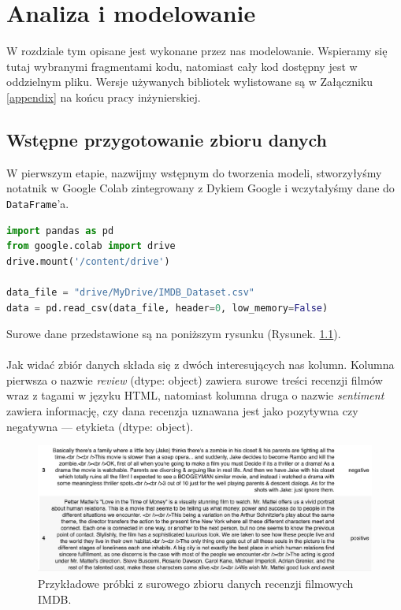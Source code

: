 \chapter{Analiza i modelowanie}
W rozdziale tym opisane jest wykonane przez nas modelowanie. Wspieramy się tutaj wybranymi fragmentami kodu, natomiast cały kod dostępny jest w oddzielnym pliku. Wersje używanych bibliotek wylistowane są w Załączniku \ref{appendix} na końcu pracy inżynierskiej.

\section{Wstępne przygotowanie zbioru danych} 
W pierwszym etapie, nazwijmy wstępnym do tworzenia modeli, stworzyłyśmy notatnik w Google Colab zintegrowany z Dykiem Google i wczytałyśmy dane do \verb|DataFrame|'a.

\begin{lstlisting}[language=Python,frame=single, breaklines=true,caption=Wczytywanie surowych danych z Dysku Google do DataFrame'a.,label=code:readData]
import pandas as pd
from google.colab import drive
drive.mount('/content/drive')

data_file = "drive/MyDrive/IMDB_Dataset.csv"
data = pd.read_csv(data_file, header=0, low_memory=False)
\end{lstlisting}

\noindent Surowe dane przedstawione są na poniższym rysunku (Rysunek. \ref{fig:rawDataset}). \\ \\
\noindent Jak widać zbiór danych składa się z dwóch interesujących nas kolumn. Kolumna pierwsza o nazwie \textit{review} (dtype: object) zawiera surowe treści recenzji filmów wraz z tagami w języku HTML, natomiast kolumna druga o nazwie \textit{sentiment} zawiera informację, czy dana recenzja uznawana jest jako pozytywna czy negatywna --- etykieta (dtype: object). \\

\begin{figure}[H]
	\centering
	\includegraphics[width=0.95\linewidth]{images/chapter3/raw-data-example.pdf}
	\caption{Przykładowe próbki z surowego zbioru danych recenzji filmowych IMDB.}
	\label{fig:rawDataset}
\end{figure}


